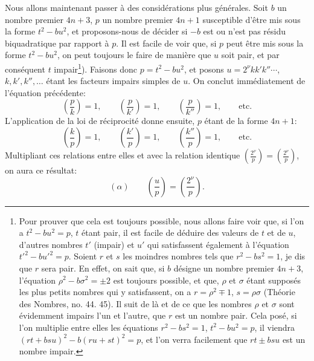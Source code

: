 \documentclass[11pt]{article}
\newcommand{\leg}[2]{\left(\frac{#1}{#2}\right)}
\newcommand{\unitid}[1]{\hypertarget{#1}{}}
\begin{document}
\unitid{dirichlet.v1.p04a.par.018}Nous allons maintenant passer à des considérations plus générales. Soit $b$ un nombre premier $4n+3$, $p$ un nombre premier $4n+1$ susceptible d'être mis sous la forme $t^2-bu^2$, et proposons-nous de décider si $-b$ est ou n'est pas résidu biquadratique par rapport à $p$. Il est facile de voir que, si $p$ peut être mis sous la forme $t^2-bu^2$, on peut toujours le faire de manière que $u$ soit pair, et par conséquent $t$ impair\footnote{Pour prouver que cela est toujours possible, nous allons faire voir que, si l'on a $t^2-bu^2=p$, $t$ étant pair, il est facile de déduire des valeurs de $t$ et de $u$, d'autres nombres $t'$ (impair) et $u'$ qui satisfassent également à l'équation $t'^2-bu'^2=p$. Soient $r$ et $s$ les moindres nombres tels que $r^2-bs^2=1$, je dis que $r$ sera pair. En effet, on sait que, si $b$ désigne un nombre premier $4n+3$, l'équation $\rho^2-b\sigma^2=\pm2$ est toujours possible, et que, $\rho$ et $\sigma$ étant supposés les plus petits nombres qui y satisfassent, on a $r=\rho^2\mp1$, $s=\rho\sigma$ (Théorie des Nombres, no. 44. 45). Il suit de là et de ce que les nombres $\rho$ et $\sigma$ sont évidemment impairs l'un et l'autre, que $r$ est un nombre pair. Cela posé, si l'on multiplie entre elles les équations $r^2-bs^2=1$, $t^2-bu^2=p$, il viendra $(rt+bsu)^2-b(ru+st)^2=p$, et l'on verra facilement que $rt\pm bsu$ est un nombre impair.}). Faisons donc $p=t^2-bu^2$, et posons $u=2^\nu kk'k''\cdots$, $k,k',k'',\ldots$ étant les facteurs impairs simples de $u$. On conclut immédiatement de l'équation précédente:
\[
\leg{p}{k}=1,\qquad \leg{p}{k'}=1,
\qquad \leg{p}{k''}=1,\qquad \text{etc.}
\]
L'application de la loi de réciprocité donne ensuite, $p$ étant de la forme $4n+1$:
\[
\leg{k}{p}=1,\qquad \leg{k'}{p}=1,
\qquad \leg{k''}{p}=1,\qquad \text{etc.}
\]
Multipliant ces relations entre elles et avec la relation identique $\leg{2^\nu}{p}=\leg{2^\nu}{p}$, on aura ce résultat:
\[
(\alpha)\qquad \leg{u}{p}=\leg{2^\nu}{p}.
\]
\end{document}
